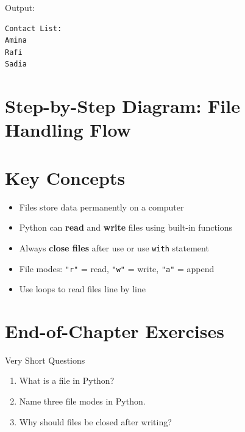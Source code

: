 Output:

\begin{verbatim}
Contact List:
Amina
Rafi
Sadia
\end{verbatim}

\section{Step-by-Step Diagram: File Handling Flow}

\begin{center}
\end{center}

\section{Key Concepts}

\begin{itemize}
    \item Files store data permanently on a computer  
    \item Python can \textbf{read} and \textbf{write} files using built-in functions  
    \item Always \textbf{close files} after use or use \texttt{with} statement  
    \item File modes: \texttt{"r"} = read, \texttt{"w"} = write, \texttt{"a"} = append  
    \item Use loops to read files line by line  
\end{itemize}

\section{End-of-Chapter Exercises}

\begin{exercise}{Very Short Questions}
\begin{enumerate}
    \item What is a file in Python?  
    \item Name three file modes in Python.  
    \item Why should files be closed after writing?  
\end{enumerate}
\end{exercise}

